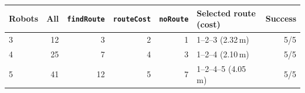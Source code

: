 \begin{tabular}{@{}lrrrrlr@{}}
\toprule
Robots & All & \texttt{findRoute} & \texttt{routeCost} & \texttt{noRoute} & Selected route (cost) & Success \\
\midrule
3 & 12 & 3 & 2 & 1 & 1--2--3 (2.32\,m) & 5/5 \\
4 & 25 & 7 & 4 & 3 & 1--2--4 (2.10\,m) & 5/5 \\
5 & 41 & 12 & 5 & 7 & 1--2--4--5 (4.05\,m) & 5/5 \\
\bottomrule
\end{tabular}
